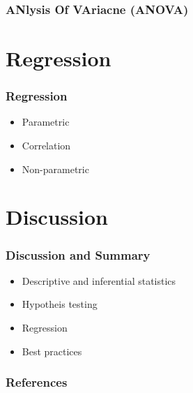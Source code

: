 \documentclass[10pt, compress]{beamer}
\begin{document}
\begin{frame}
    \frametitle{ANlysis Of VAriacne (ANOVA)}
\end{frame}

\section{Regression}

\begin{frame}
    \frametitle{Regression}
    \begin{itemize}
        \item Parametric
        \item Correlation
        \item Non-parametric
    \end{itemize}
\end{frame}

\section{Discussion}

\begin{frame}
    \frametitle{Discussion and Summary}
    \begin{itemize}
        \item Descriptive and inferential statistics
        \item Hypotheis testing
        \item Regression
        \item Best practices
    \end{itemize}
\end{frame}

\begin{frame}
    \frametitle{References}
\end{frame}
\end{document}
